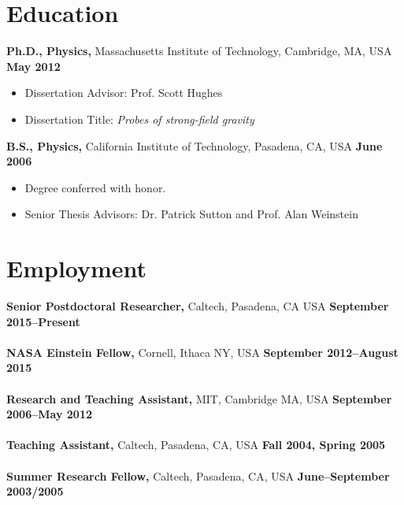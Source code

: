 \documentclass[margin,line]{res}
\begin{document}
\newcommand{\myname}{Leo C. Stein}
\newlength{\mynamewidth}
\settowidth{\mynamewidth}{\namefont\myname}

\name{\hspace*{0.5\textwidth}\hspace{-0.5\mynamewidth} \myname \vspace*{.1in}}
\thispagestyle{empty}

\begin{resume}




\section{\sc Education}
{\bf Ph.D., Physics,} Massachusetts Institute of Technology, Cambridge, MA, USA \hfill {\bf May 2012}\\
\vspace*{-.1in}
\begin{itemize}
\item[ ] Dissertation Advisor: Prof. Scott Hughes
\item[ ] Dissertation Title: {\it Probes of strong-field gravity}
\end{itemize}

{\bf B.S., Physics,} California Institute of
Technology, Pasadena, CA, USA \hfill {\bf June 2006}\\
\vspace*{-.1in}
\begin{itemize}
\item[ ] Degree conferred with honor.
\item[ ] Senior Thesis Advisors: Dr. Patrick Sutton and Prof. Alan Weinstein
\end{itemize}

\section{\sc Employment}
{\bf Senior Postdoctoral Researcher,} Caltech, Pasadena, CA USA
\hfill {\bf September 2015--Present}\\
\\
{\bf NASA Einstein Fellow,} Cornell, Ithaca NY, USA
\hfill {\bf September 2012--August 2015}\\
\\
{\bf Research and Teaching Assistant,} MIT, Cambridge MA, USA \hfill {\bf September 2006--May 2012}\\
\\
{\bf Teaching Assistant,} Caltech, Pasadena, CA, USA \hfill {\bf  Fall 2004, Spring 2005}\\
\\
{\bf Summer Research Fellow,} Caltech, Pasadena, CA, USA \hfill {\bf  June--September 2003/2005}\\


\end{resume}
\end{document}
